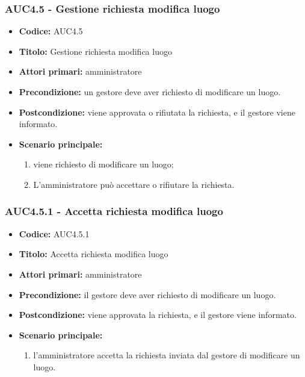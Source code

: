 \documentclass[casi-duso]{subfiles}
\begin{document}
\subsubsection{AUC4.5 - Gestione richiesta modifica luogo}%
\label{subsub:AUC4.5}
\begin{itemize}
  \item \textbf{Codice:} AUC4.5
  \item \textbf{Titolo:} Gestione richiesta modifica luogo
  \item \textbf{Attori primari:} amministratore
  \item \textbf{Precondizione:} un gestore deve aver richiesto di modificare un luogo.
  \item \textbf{Postcondizione:} viene approvata o rifiutata la richiesta, e il gestore viene informato.
  \item \textbf{Scenario principale:}
  \begin{enumerate}
    \item viene richiesto di modificare un luogo;
    \item L'amministratore può accettare o rifiutare la richiesta.
  \end{enumerate}
\end{itemize}

\subsubsection{AUC4.5.1 - Accetta richiesta modifica luogo}%
\label{subsub:AUC4.5.1}
\begin{itemize}
  \item \textbf{Codice:} AUC4.5.1
  \item \textbf{Titolo:} Accetta richiesta modifica luogo
  \item \textbf{Attori primari:} amministratore
  \item \textbf{Precondizione:} il gestore deve aver richiesto di modificare un luogo.
  \item \textbf{Postcondizione:} viene approvata la richiesta, e il gestore viene informato.
  \item \textbf{Scenario principale:}
  \begin{enumerate}
    \item  l'amministratore accetta la richiesta inviata dal gestore di modificare un luogo.
  \end{enumerate}
\end{itemize}
\end{document}
